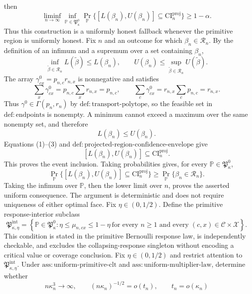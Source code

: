 then
\[
\liminf_{n\to\infty}\inf_{\mathbb P\in\mathfrak P_{\kappa}^{0}}
\Pr_{\mathbb P}\{[L(\beta_n),U(\beta_n)]\subseteq\mathrm{CI}_n^{\mathrm{proj}}\}
\geq1-\alpha.
\]
Thus this construction is a uniformly honest fallback whenever the primitive region is uniformly honest.
Fix \(n\) and an outcome for which \(\beta_n\in\mathcal R_n\).  By the definition of an infimum and a supremum over a set containing \(\beta_n\),
\[
\inf_{\widetilde\beta\in\mathcal R_n}L(\widetilde\beta)
\leq L(\beta_n),
\qquad
U(\beta_n)
\leq\sup_{\widetilde\beta\in\mathcal R_n}U(\widetilde\beta).
\tag{1}
\]
The array \(\gamma^0_{cx}=p_{n,c}r_{n,x}\) is nonnegative and satisfies
\[
\sum_x\gamma^0_{cx}=p_{n,c}\sum_xr_{n,x}=p_{n,c},
\qquad
\sum_c\gamma^0_{cx}=r_{n,x}\sum_cp_{n,c}=r_{n,x}.
\tag{2}
\]
Thus \(\gamma^0\in\Gamma(p_n,r_n)\) by \(\mathrm{def:transport\text{-}polytope}\), so the feasible set in \(\mathrm{def:endpoints}\) is nonempty.  A minimum cannot exceed a maximum over the same nonempty set, and therefore
\[
L(\beta_n)\leq U(\beta_n).
\tag{3}
\]
Equations (1)--(3) and \(\mathrm{def:projected\text{-}region\text{-}confidence\text{-}envelope}\) give
\[
[L(\beta_n),U(\beta_n)]
\subseteq\mathrm{CI}_n^{\mathrm{proj}}.
\tag{4}
\]
This proves the event inclusion.  Taking probabilities gives, for every \(\mathbb P\in\mathfrak P_{\kappa}^{0}\),
\[
\Pr_{\mathbb P}\{[L(\beta_n),U(\beta_n)]\subseteq\mathrm{CI}_n^{\mathrm{proj}}\}
\geq
\Pr_{\mathbb P}\{\beta_n\in\mathcal R_n\}.
\tag{5}
\]
Taking the infimum over \(\mathbb P\), then the lower limit over \(n\), proves the asserted uniform consequence.  The argument is deterministic and does not require uniqueness of either optimal face.
Fix \(\eta\in(0,1/2)\).  Define the primitive response-interior subclass
\[
\mathfrak P_{\kappa,\eta}^{\mathrm{int}}
=\left\{\mathbb P\in\mathfrak P_{\kappa}^{0}:
\eta\leq\mu_{n,cx}\leq1-\eta
\ \text{for every }n\geq1\text{ and every }(c,x)\in\mathcal C\times\mathcal X
\right\}.
\]
This condition is stated in the primitive Bernoulli response law, is independently checkable, and excludes the collapsing-response singleton without encoding a critical value or coverage conclusion.
Fix \(\eta\in(0,1/2)\) and restrict attention to \(\mathfrak P_{\kappa,\eta}^{\mathrm{int}}\).  Under \(\mathrm{ass:uniform\text{-}primitive\text{-}clt}\) and \(\mathrm{ass:uniform\text{-}multiplier\text{-}law}\), determine whether
\[
n\kappa_n^3\to\infty,
\qquad
(n\kappa_n)^{-1/2}=o(t_n),
\qquad
t_n=o(\kappa_n)
\]
